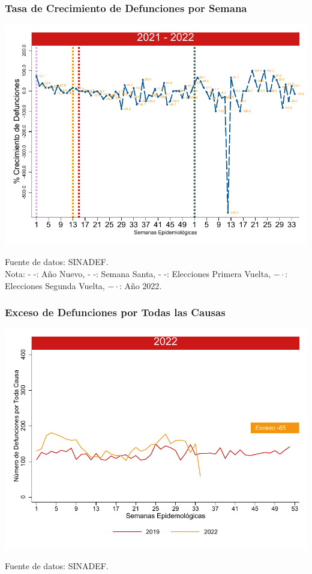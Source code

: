\documentclass[xcolor=table]{beamer}
\begin{document}
\begin{frame}
	\frametitle{Tasa de Crecimiento de Defunciones por Semana}
	\vspace{-.5cm}
	\begin{center}
		\includegraphics[width=0.9\linewidth]{../figuras/defunciones_tasa_crecimiento_21_22.pdf}
	\end{center} 
	{\tiny Fuente de datos: SINADEF. \\
		Nota: {\color{mycolor1} - -: Año Nuevo}, {\color{mycolor2} - -: Semana Santa}, {\color{mycolor3} - -: Elecciones Primera Vuelta}, {\color{mycolor4} $- \cdot$: Elecciones Segunda Vuelta}, {\color{mycolor7} $- \cdot$: Año 2022}. \\}
\end{frame}

\begin{frame}
	\frametitle{Exceso de Defunciones por Todas las Causas}
	\vspace{-.5cm}
	\begin{center}
		\includegraphics[width=0.9\linewidth]{../figuras/exceso_region_2022.pdf}
	\end{center}
	{\tiny Fuente de datos: SINADEF.} 
\end{frame}
	
\end{document}
